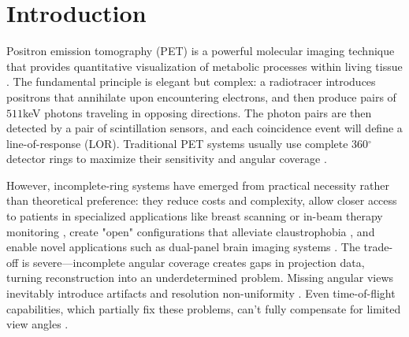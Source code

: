 \documentclass[12pt]{iopart}
\begin{document}
%
%
%
% 
%

\section{Introduction}
\label{chap:introduction}


Positron emission tomography (PET) is a powerful molecular imaging technique that provides quantitative visualization of metabolic processes within living tissue \cite{townsend2004, muehllehner2006positron, lameka2016positron, shukla2006positron, nutt2002history}. The fundamental principle is elegant but complex: a radiotracer introduces positrons that annihilate upon encountering electrons, and then produce pairs of $511$keV photons traveling in opposing directions. 
The photon pairs are then detected by a pair of scintillation sensors, and each coincidence event will define a line-of-response (LOR).
Traditional PET systems usually use complete 360$^\circ$ detector rings to maximize their sensitivity and angular coverage \cite{townsend2004}.

However, incomplete-ring systems have emerged from practical necessity rather than theoretical preference: they reduce costs and complexity, allow closer access to patients in specialized applications like breast scanning or in-beam therapy monitoring \cite{surti2008}, create "open" configurations that alleviate claustrophobia \cite{tashima2012, krishnamoorthy2021}, and enable novel applications such as dual-panel brain imaging systems \cite{zhang2020}. The trade-off is severe—incomplete angular coverage creates gaps in projection data, turning reconstruction into an underdetermined problem. Missing angular views inevitably introduce artifacts and resolution non-uniformity \cite{kak1988, surti2008}. Even time-of-flight capabilities, which partially fix these problems, can't fully compensate for limited view angles \cite{surti2008, krishnamoorthy2021}.
\end{document}
